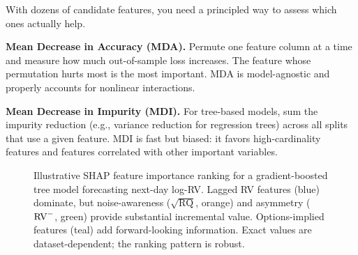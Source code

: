 With dozens of candidate features, you need a principled way to assess which ones actually help.

\textbf{Mean Decrease in Accuracy (MDA).}
Permute one feature column at a time and measure how much out-of-sample loss increases.
The feature whose permutation hurts most is the most important.
MDA is model-agnostic and properly accounts for nonlinear interactions.

\textbf{Mean Decrease in Impurity (MDI).}
For tree-based models, sum the impurity reduction (e.g., variance reduction for regression trees) across all splits that use a given feature.
MDI is fast but biased: it favors high-cardinality features and features correlated with other important variables.

\begin{figure}[ht]
\centering
{}
\caption{Illustrative SHAP feature importance ranking for a gradient-boosted tree model forecasting next-day log-RV. Lagged RV features (blue) dominate, but noise-awareness ($\sqrt{\operatorname{RQ}}$, orange) and asymmetry ($\operatorname{RV}^-$, green) provide substantial incremental value. Options-implied features (teal) add forward-looking information. Exact values are dataset-dependent; the ranking pattern is robust.}
\label{fig:feature-importance}
\end{figure}

